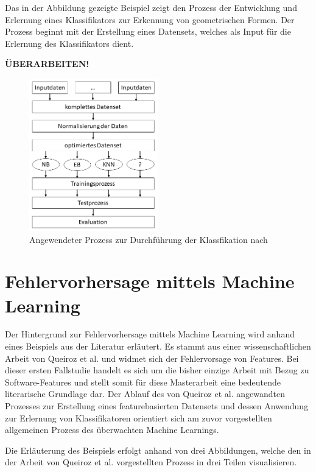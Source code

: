 Das in der Abbildung gezeigte Beispiel zeigt den Prozess der Entwicklung und Erlernung eines Klassifikators zur Erkennung von geometrischen Formen.
Der Prozess beginnt mit der Erstellung eines Datensets, welches als Input für die Erlernung des Klassifikators dient.

\textbf{ÜBERARBEITEN!}

\begin{figure}[H]
    \centering
    \includegraphics[width=0.5\textwidth]{images/Prozess}
    \caption{Angewendeter Prozess zur Durchführung der Klassfikation nach \cite{Ceylan2006}}\label{fig:process}
\end{figure}

\section{Fehlervorhersage mittels Machine Learning}

Der Hintergrund zur Fehlervorhersage mittels Machine Learning wird anhand eines Beispiels aus der Literatur erläutert. Es stammt aus einer wissenschaftlichen Arbeit von Queiroz et al. \cite{Queiroz2016} und widmet sich der Fehlervorsage von Features. Bei dieser ersten Fallstudie handelt es sich um die bisher einzige Arbeit mit Bezug zu Software-Features und stellt somit für diese Masterarbeit eine bedeutende literarische Grundlage dar. Der Ablauf des von Queiroz et al. angewandten Prozesses zur Erstellung eines featurebasierten Datensets und dessen Anwendung zur Erlernung von Klassifikatoren orientiert sich am zuvor vorgestellten allgemeinen Prozess des überwachten Machine Learnings.

Die Erläuterung des Beispiels erfolgt anhand von drei Abbildungen, welche den in der Arbeit von Queiroz et al. vorgestellten Prozess in drei Teilen visualisieren. 

